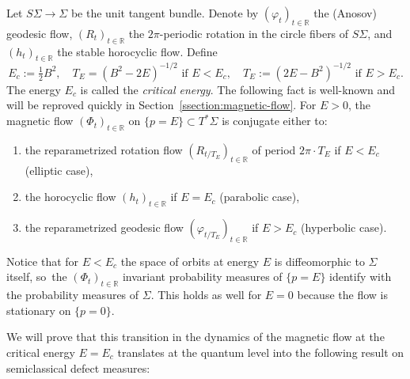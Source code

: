 \documentclass[10pt,a4paper]{amsart}
\theoremstyle{plain}
\theoremstyle{definition}
\newcommand{\R}{\mathbb{R}}
\let\Si\Sigma
\begin{document}
Let $S\Sigma \to \Sigma$ be the unit tangent bundle. Denote by $(\varphi_t)_{t \in \R}$ the (Anosov) geodesic flow, $(R_t)_{t \in \R}$ the $2\pi$-periodic rotation in the circle fibers of $S\Sigma$, and $(h_t)_{t \in \R}$ the stable horocyclic flow. Define
\[
E_c := \tfrac{1}{2}B^2, \quad T_E = (B^2-2E)^{-1/2} \text{ if } E < E_c, \quad T_E := (2E-B^2)^{-1/2} \text{ if } E > E_c.
\]
The energy $E_c$ is called the \emph{critical energy}. The following fact is
well-known \cite{Arnold-61,Ginzburg-96} and will be reproved quickly in
Section~\ref{ssection:magnetic-flow}. For $E > 0$, the magnetic flow $(\Phi_t)_{t \in \R}$ on $\{p=E\}
\subset T^*\Sigma$ is conjugate either to:
\begin{enumerate}

\item the reparametrized rotation flow $(R_{t/T_E})_{t \in \R}$ of period
$2\pi \cdot T_E$ if $E < E_c$ (elliptic case),

\item the horocyclic flow $(h_t)_{t \in \R}$ if $E=E_c$ (parabolic case),

\item the reparametrized geodesic flow $(\varphi_{t/T_E})_{t \in \R}$ if $E>E_c$ (hyperbolic case).
\end{enumerate}
Notice that for $E < E_c$ the space of orbits at energy $E$ is diffeomorphic to $\Si$ itself, so~the $(\Phi_t)_{t \in \R}$ invariant probability measures of $\{ p = E\}$
identify with the probability measures of $\Si$. This holds as well for
$E=0$ because the flow is stationary on $\{ p =0 \}$.

We will prove that this transition in the dynamics of the magnetic flow at the critical energy $E=E_c$ translates at the quantum level into the following result on semiclassical defect measures:
\end{document}
